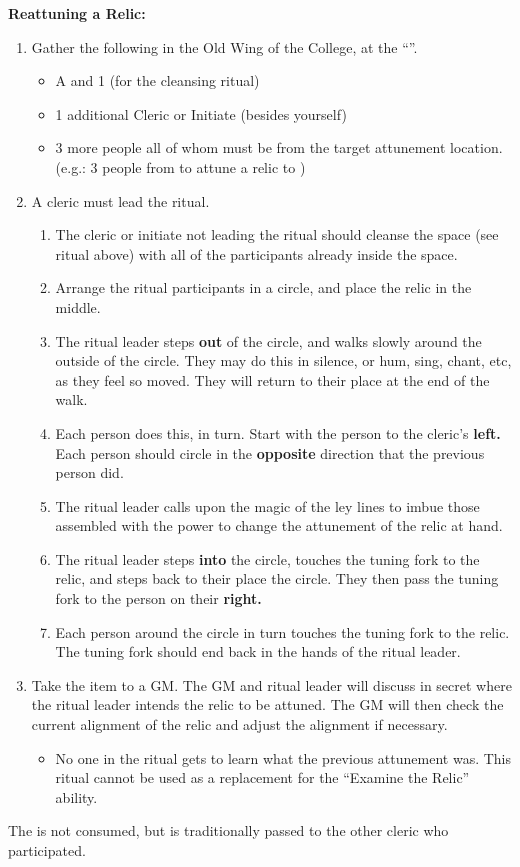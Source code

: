 \documentclass[green]{GL2020}
\begin{document}
\textbf{Reattuning a Relic:}
  \begin{enumerate}
    \item Gather the following in the Old Wing of the College, at the ``\sLeyLineNexus{}''.
    \begin{itemize}
      \item A \iTuningFork{} and 1 \iRitualCandle{} (for the cleansing ritual)
      \item 1 additional Cleric or Initiate (besides yourself)
      \item 3 more people all of whom must be  from the target attunement location. (e.g.: 3 people from \pTech{} to attune a relic to \pTech{})
    \end{itemize}
    \item A cleric must lead the ritual.
    \begin{enumerate}
      \item The cleric or initiate not leading the ritual should cleanse the space (see ritual above) with all of the participants already inside the space.
      \item Arrange the ritual participants in a circle, and place the relic in the middle.
      \item The ritual leader steps \textbf{out} of the circle, and walks slowly around the outside of the circle. They may do this in silence, or hum, sing, chant, etc, as they feel so moved. They will return to their place at the end of the walk.
      \item Each person does this, in turn. Start with the person to the cleric’s \textbf{left.} Each person should circle in the \textbf{opposite} direction that the previous person did.
      \item The ritual leader calls upon the magic of the ley lines to imbue those assembled with the power to change the attunement of the relic at hand.
      \item The ritual leader steps \textbf{into} the circle, touches the tuning fork to the relic, and steps back to their place the circle. They then pass the tuning fork to the person on their \textbf{right.}
      \item Each person around the circle in turn touches the tuning fork to the relic. The tuning fork should end back in the hands of the ritual leader.
    \end{enumerate}
    \item Take the item to a GM. The GM and ritual leader will discuss in secret where the ritual leader intends the relic to be attuned. The GM will then check the current alignment of the relic and adjust the alignment if necessary.
    \begin{itemize}
      \item No one in the ritual gets to learn what the previous attunement was. This ritual cannot be used as a replacement for the ``Examine the Relic'' ability.
    \end{itemize}
  \end{enumerate}
The \iTuningFork{} is not consumed, but is traditionally passed to the other cleric who participated.
   
\end{document}
